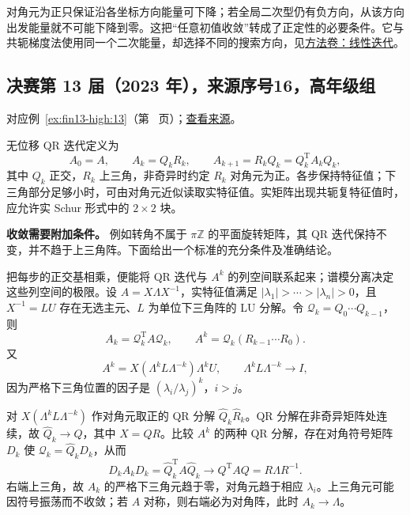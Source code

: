\documentclass[UTF8,12pt,a4paper,fontset=fandol]{ctexart}
\begin{document}
\begin{remark}[方法与条件]

对角元为正只保证沿各坐标方向能量可下降；若全局二次型仍有负方向，从该方向出发能量就不可能下降到零。这把“任意初值收敛”转成了正定性的必要条件。它与共轭梯度法使用同一个二次能量，却选择不同的搜索方向，见\hyperref[app:linear-iteration]{方法卷：线性迭代}。

\end{remark}

\subsection{决赛第 13 届（2023 年），来源序号16，高年级组}\label{ans:fin13-high:13}\label{pr:fin13-high:13}

对应例~\ref{ex:fin13-high:13}（第~\pageref{ex:fin13-high:13} 页）；\href{https://github.com/lzxcr/cmc-mathematics/blob/64916fa1fdbc3e444a652eca204d5669058ee321/src/problems/finals/13/16.md}{查看来源}。

\begin{solve}

无位移 QR 迭代定义为
\[
A_0=A,\qquad A_k=Q_kR_k,\qquad A_{k+1}=R_kQ_k=Q_k^{\mathrm T}A_kQ_k,
\]
其中 $Q_k$ 正交，$R_k$ 上三角，非奇异时约定 $R_k$ 对角元为正。各步保持特征值；下三角部分足够小时，可由对角元近似读取实特征值。实矩阵出现共轭复特征值时，应允许实 Schur 形式中的 $2\times2$ 块。

\textbf{收敛需要附加条件。} 例如转角不属于 $\pi\mathbb Z$ 的平面旋转矩阵，其 QR 迭代保持不变，并不趋于上三角阵。下面给出一个标准的充分条件及准确结论。

把每步的正交基相乘，便能将 QR 迭代与 $A^k$ 的列空间联系起来；谱模分离决定这些列空间的极限。设 $A=X\Lambda X^{-1}$，实特征值满足 $|\lambda_1|>\cdots>|\lambda_n|>0$，且 $X^{-1}=LU$ 存在无选主元、$L$ 为单位下三角阵的 LU 分解。令 $\mathcal Q_k=Q_0\cdots Q_{k-1}$，则
\[
A_k=\mathcal Q_k^{\mathrm T}A\mathcal Q_k,\qquad
A^k=\mathcal Q_k(R_{k-1}\cdots R_0).
\]
又
\[
A^k=X(\Lambda^kL\Lambda^{-k})\Lambda^kU,
\qquad \Lambda^kL\Lambda^{-k}\longrightarrow I,
\]
因为严格下三角位置的因子是 $(\lambda_i/\lambda_j)^k$，$i>j$。

对 $X(\Lambda^kL\Lambda^{-k})$ 作对角元取正的 QR 分解 $\widehat Q_k\widehat R_k$。QR 分解在非奇异矩阵处连续，故 $\widehat Q_k\to Q$，其中 $X=QR$。比较 $A^k$ 的两种 QR 分解，存在对角符号矩阵 $D_k$ 使 $\mathcal Q_k=\widehat Q_kD_k$，从而
\[
D_kA_kD_k=\widehat Q_k^{\mathrm T}A\widehat Q_k
\longrightarrow Q^{\mathrm T}AQ=R\Lambda R^{-1}.
\]
右端上三角，故 $A_k$ 的严格下三角元趋于零，对角元趋于相应 $\lambda_i$。上三角元可能因符号振荡而不收敛；若 $A$ 对称，则右端必为对角阵，此时 $A_k\to\Lambda$。

\end{solve}
\end{document}
